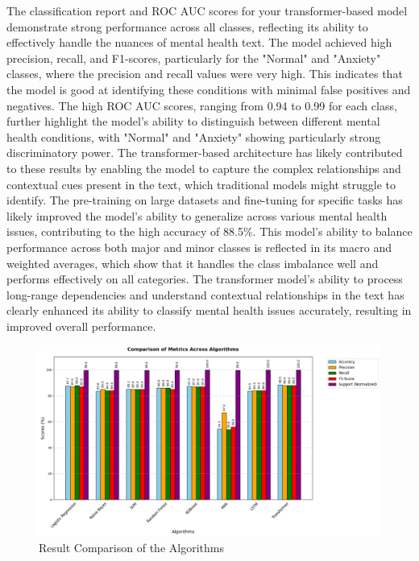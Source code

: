 \noindent 
The classification report and ROC AUC scores for your transformer-based model demonstrate strong performance across all classes, reflecting its ability to effectively handle the nuances of mental health text. The model achieved high precision, recall, and F1-scores, particularly for the "Normal" and "Anxiety" classes, where the precision and recall values were very high. This indicates that the model is good at identifying these conditions with minimal false positives and negatives. The high ROC AUC scores, ranging from 0.94 to 0.99 for each class, further highlight the model's ability to distinguish between different mental health conditions, with "Normal" and "Anxiety" showing particularly strong discriminatory power. The transformer-based architecture has likely contributed to these results by enabling the model to capture the complex relationships and contextual cues present in the text, which traditional models might struggle to identify. The pre-training on large datasets and fine-tuning for specific tasks has likely improved the model's ability to generalize across various mental health issues, contributing to the high accuracy of 88.5\%. This model's ability to balance performance across both major and minor classes is reflected in its macro and weighted averages, which show that it handles the class imbalance well and performs effectively on all categories. The transformer model's ability to process long-range dependencies and understand contextual relationships in the text has clearly enhanced its ability to classify mental health issues accurately, resulting in improved overall performance.

\pagebreak

\begin{figure}[h!]  
    \centering
    \includegraphics[width=1.0\textwidth]{Images/ML GRAPH 1.png}  
    \caption{Result Comparison of the Algorithms}
    \label{dfdl145}  %
\end{figure}

